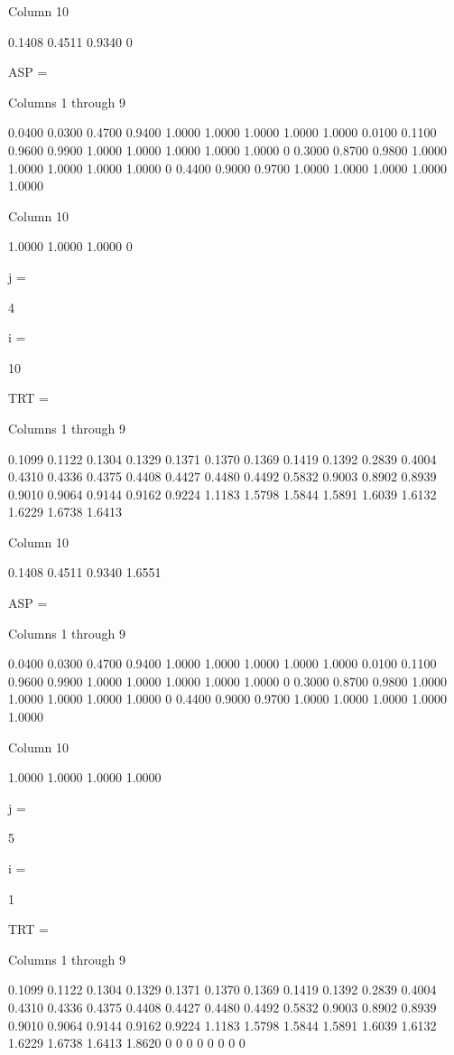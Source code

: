   Column 10

    0.1408
    0.4511
    0.9340
         0


ASP =

  Columns 1 through 9

    0.0400    0.0300    0.4700    0.9400    1.0000    1.0000    1.0000    1.0000    1.0000
    0.0100    0.1100    0.9600    0.9900    1.0000    1.0000    1.0000    1.0000    1.0000
         0    0.3000    0.8700    0.9800    1.0000    1.0000    1.0000    1.0000    1.0000
         0    0.4400    0.9000    0.9700    1.0000    1.0000    1.0000    1.0000    1.0000

  Column 10

    1.0000
    1.0000
    1.0000
         0


j =

     4


i =

    10


TRT =

  Columns 1 through 9

    0.1099    0.1122    0.1304    0.1329    0.1371    0.1370    0.1369    0.1419    0.1392
    0.2839    0.4004    0.4310    0.4336    0.4375    0.4408    0.4427    0.4480    0.4492
    0.5832    0.9003    0.8902    0.8939    0.9010    0.9064    0.9144    0.9162    0.9224
    1.1183    1.5798    1.5844    1.5891    1.6039    1.6132    1.6229    1.6738    1.6413

  Column 10

    0.1408
    0.4511
    0.9340
    1.6551


ASP =

  Columns 1 through 9

    0.0400    0.0300    0.4700    0.9400    1.0000    1.0000    1.0000    1.0000    1.0000
    0.0100    0.1100    0.9600    0.9900    1.0000    1.0000    1.0000    1.0000    1.0000
         0    0.3000    0.8700    0.9800    1.0000    1.0000    1.0000    1.0000    1.0000
         0    0.4400    0.9000    0.9700    1.0000    1.0000    1.0000    1.0000    1.0000

  Column 10

    1.0000
    1.0000
    1.0000
    1.0000


j =

     5


i =

     1


TRT =

  Columns 1 through 9

    0.1099    0.1122    0.1304    0.1329    0.1371    0.1370    0.1369    0.1419    0.1392
    0.2839    0.4004    0.4310    0.4336    0.4375    0.4408    0.4427    0.4480    0.4492
    0.5832    0.9003    0.8902    0.8939    0.9010    0.9064    0.9144    0.9162    0.9224
    1.1183    1.5798    1.5844    1.5891    1.6039    1.6132    1.6229    1.6738    1.6413
    1.8620         0         0         0         0         0         0         0         0

